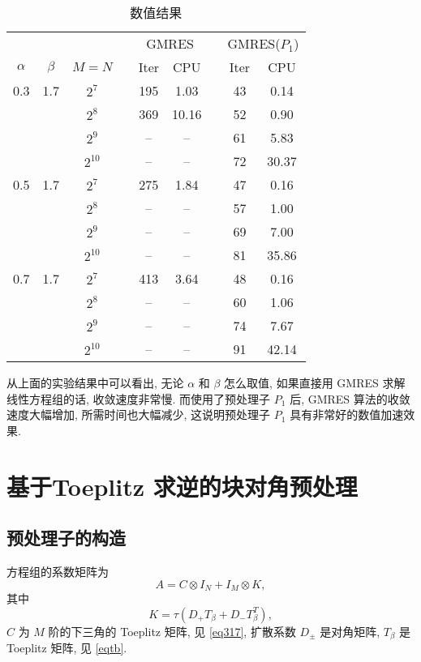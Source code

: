 \documentclass{ecnumaster}
\begin{document}
\begin{table}[H] %
\centering %
\caption{数值结果} \label{tab33412}\smallskip %
\begin{tabular}{ccccccccc} \toprule
& &  && \multicolumn{2}{c}{GMRES} && \multicolumn{2}{c}{GMRES($P_1$)} \\
$\alpha$ & $\beta$ & $M = N$ && Iter & CPU && Iter & CPU\\ \midrule
0.3 &1.7
 & $2^7$    && 195 &1.03  && 43 &0.14  \\
&& $2^8$    && 369 &10.16 && 52 &0.90  \\
&& $2^9$    && --  &--    && 61 &5.83  \\
&& $2^{10}$ && --  &--    && 72 &30.37 \\\midrule
0.5 &1.7
 & $2^7$    && 275 &1.84  && 47 &0.16  \\
&& $2^8$    && --  &--    && 57 &1.00  \\
&& $2^9$    && --  &--    && 69 &7.00  \\
&& $2^{10}$ && --  &--    && 81 &35.86 \\\midrule
0.7 &1.7
 & $2^7$    && 413 &3.64  && 48 &0.16  \\
&& $2^8$    && --  &--    && 60 &1.06  \\
&& $2^9$    && --  &--    && 74 &7.67  \\
&& $2^{10}$ && --  &--    && 91 &42.14 \\\bottomrule
\end{tabular}
\end{table}

从上面的实验结果中可以看出,
无论 $\alpha$ 和 $\beta$ 怎么取值,
如果直接用 GMRES 求解线性方程组的话, 收敛速度非常慢.
而使用了预处理子 $P_1$ 后, GMRES 算法的收敛速度大幅增加, 所需时间也大幅减少,
这说明预处理子 $P_1$ 具有非常好的数值加速效果.

\section{基于Toeplitz 求逆的块对角预处理}
\subsection{预处理子的构造}
方程组的系数矩阵为
$$
  A = C \otimes I_N + I_M \otimes K,
$$
其中
$$
  K = \tau (D_+T_{\beta} + D_-T_{\beta}^T),
$$
$C$ 为 $M$ 阶的下三角的 Toeplitz 矩阵, 见 \eqref{eq317},
扩散系数 $D_{\pm}$ 是对角矩阵,
$T_{\beta}$ 是 Toeplitz 矩阵, 见 \eqref{eqtb}.
\end{document}
